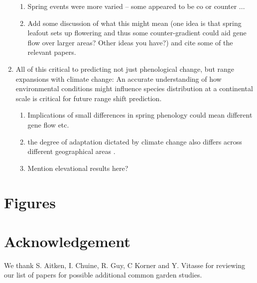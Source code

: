 \documentclass{article}
\begin{document}
\begin{enumerate}
\begin{enumerate}
\item Spring events were more varied -- some appeared to be co or counter ... 
\item Add some discussion of what this might mean (one idea is that spring leafout sets up flowering and thus some counter-gradient could aid gene flow over larger areas? Other ideas you have?) and cite some of the relevant papers. 
\end{enumerate}
\item All of this critical to predicting not just phenological change, but range expansions with climate change: An accurate understanding of how environmental conditions might influence species distribution at a continental scale is critical for future range shift prediction.
\begin{enumerate}
\item Implications of small differences in spring phenology could mean different gene flow etc. 
\item the degree of adaptation dictated by climate change also differs across different geographical areas \citep{Loarie09}. 
\item Mention elevational results here? 
\end{enumerate}
\end{enumerate}







\section{Figures}







\section{Acknowledgement}
We thank S. Aitken,  I. Chuine, R. Guy, C Korner and Y. Vitasse for reviewing our list of papers for possible additional common garden studies. 
\end{document}
